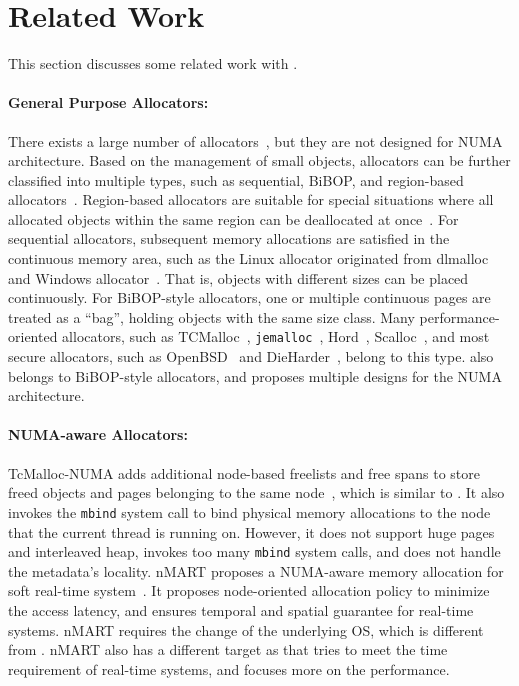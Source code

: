 \section{Related Work}

\label{sec:related}

This section discusses some related work with \NM{}. 

\paragraph{General Purpose Allocators:}
 There exists a large number of allocators~\cite{dlmalloc,Hoard,tcmalloc,jemalloc,Scalloc}, but they are not designed for NUMA architecture. Based on the management of small objects, allocators can be further classified into multiple types, such as sequential, BiBOP, and region-based allocators~\cite{Gay:1998:MME:277650.277748,  DieHarder}. Region-based allocators are suitable for special situations where all allocated objects within the same region can be deallocated at once~\cite{Gay:1998:MME:277650.277748}. For sequential allocators, subsequent memory allocations are satisfied in the continuous memory area, such as the Linux allocator originated from dlmalloc~\cite{dlmalloc} and Windows allocator~\cite{DieHarder}. That is, objects with different sizes can be placed continuously. For BiBOP-style allocators, one or multiple continuous pages are treated as a ``bag'', holding objects with the same size class. Many performance-oriented allocators, such as TCMalloc~\cite{tcmalloc}, \texttt{jemalloc}~\cite{jemalloc}, Hord~\cite{Hoard}, Scalloc~\cite{Scalloc}, and most secure allocators, such as OpenBSD~\cite{OpenBSD} and DieHarder~\cite{DieHarder}, belong to this type.  \NM{} also belongs to BiBOP-style allocators, and proposes multiple designs for the NUMA architecture. 

\paragraph{NUMA-aware Allocators:} TcMalloc-NUMA adds additional node-based freelists and free spans to store freed objects and pages belonging to the same node~\cite{tcmallocnew}, which is similar to \NM{}. It also invokes the \texttt{mbind} system call to bind physical memory allocations to the node that the current thread is running on. However, it does not support huge pages and interleaved heap, invokes too many \texttt{mbind} system calls, and does not handle the metadata's locality. nMART proposes a NUMA-aware memory allocation for soft real-time system~\cite{kim2013node}. It proposes node-oriented allocation policy to minimize the access latency, and ensures temporal and spatial guarantee for real-time systems. nMART requires the change of the underlying OS, which is different from \NM{}. nMART also has a different target as \NM{} that tries to meet the time requirement of real-time systems, and \NM{} focuses more on the performance.


